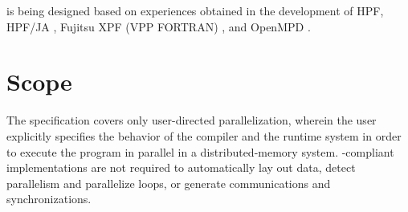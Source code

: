 \begin{itemize}
%
%
%
%
%

\end{itemize}

{\XMP} is being designed based on experiences obtained in the
development of HPF, HPF/JA \cite{hpfja}, Fujitsu XPF (VPP
FORTRAN) \cite{XPF,VPPFORTRAN}, and OpenMPD \cite{OpenMPD}.

\section{Scope}

The {\XMP} specification covers only user-directed parallelization,
wherein the user explicitly specifies the behavior of the compiler and
the runtime system in order to execute the program in parallel in a
distributed-memory system.
%
{\XMP}-compliant implementations are not required to automatically
lay out data, detect parallelism and parallelize loops, or generate
communications and synchronizations.

%


